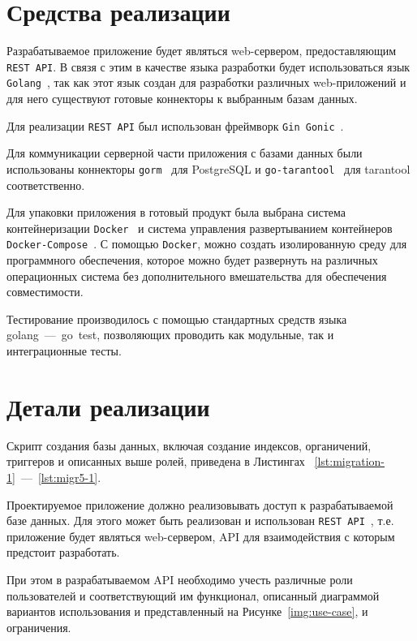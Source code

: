 
\section{Средства реализации}

Разрабатываемое приложение будет являться web-сервером, предоставляющим \texttt{REST API}. В связя с этим в качестве языка разработки будет использоваться язык \texttt{Golang}~\cite{golang}, так как этот язык создан для разработки различных web-приложений и для него существуют готовые коннекторы к выбранным базам данных.

Для реализации \texttt{REST API} был использован фреймворк \texttt{Gin Gonic}~\cite{gingonic}.

Для коммуникации серверной части приложения с базами данных были использованы коннекторы \texttt{gorm}~\cite{gorm} для PostgreSQL и \texttt{go-tarantool}~\cite{go-tarantool} для tarantool соответственно.

Для упаковки приложения в готовый продукт была выбрана система контейнеризации \texttt{Docker}~\cite{docker} и система управления развертыванием контейнеров \texttt{Docker-Compose}~\cite{docker-compose}. С помощью \texttt{Docker}, можно создать изолированную среду для программного обеспечения, которое можно будет развернуть на различных операционных система без дополнительного вмешательства для обеспечения совместимости.

Тестирование производилось с помощью стандартных средств языка golang~---~go~test, позволяющих проводить как модульные, так и интеграционные тесты.

\section{Детали реализации}

Скрипт создания базы данных, включая создание индексов, органичений, триггеров и описанных выше ролей, приведена в Листингах ~\ref{lst:migration-1}~---~\ref{lst:migr5-1}.

Проектируемое приложение должно реализовывать доступ к разрабатываемой базе данных. Для этого может быть реализован и использован \texttt{REST API}~\cite{rest}, т.е. приложение будет являться web-сервером, API для взаимодействия с которым предстоит разработать.

При этом в разрабатываемом API необходимо учесть различные роли пользователей и соответствующий им функционал, описанный диаграммой вариантов использования и представленный на Рисунке~\ref{img:use-case}, и ограничения.

